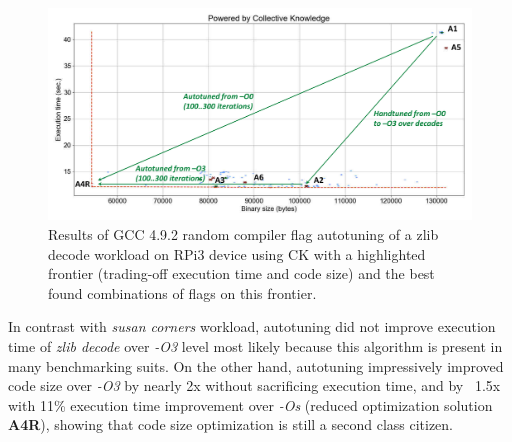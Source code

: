    \begin{figure}[!htbp]
     \centering
      \includegraphics[width=5.2in]
      {ck-assets/22f5af13e8e498aa-cropped.pdf} %
      \vspace{0.1in}
      \vspace{0.1in}
     \caption{
      Results of GCC 4.9.2 random compiler flag autotuning of a zlib decode workload on RPi3
      device using CK with a highlighted frontier (trading-off execution time and code size) 
      and the best found combinations of flags on this frontier.
     }
     \label{fig:autotuning-zlib-decode-gcc4}
   \end{figure}

In contrast with \textit{susan corners} workload, autotuning did not improve execution time 
of \textit{zlib decode} over \textit{-O3} level most likely because this algorithm is present
in many benchmarking suits. 
%
On the other hand, autotuning impressively improved code size over \textit{-O3} 
by nearly 2x without sacrificing execution time, and by ~1.5x with 11\% execution time
improvement over \textit{-Os} (reduced optimization solution \textbf{A4R}), 
showing that code size optimization is still a second class citizen.

